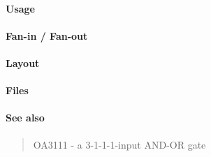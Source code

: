 \paragraph{Usage}

\paragraph{Fan-in / Fan-out}

\paragraph{Layout}

\paragraph{Files}

\paragraph{See also}
\begin{quote}
    OA3111 - a 3-1-1-1-input AND-OR gate
\end{quote}

